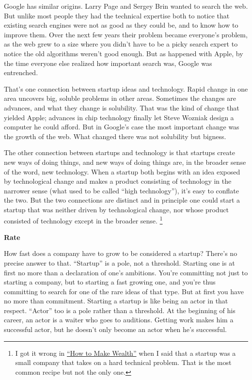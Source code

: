 \documentclass[12pt]{book}
\begin{document}
Google has similar origins. Larry Page and Sergey Brin wanted to search
the web. But unlike most people they had the technical expertise both to
notice that existing search engines were not as good as they could be,
and to know how to improve them. Over the next few years their problem
became everyone's problem, as the web grew to a size where you didn't
have to be a picky search expert to notice the old algorithms weren't
good enough. But as happened with Apple, by the time everyone else
realized how important search was, Google was entrenched.

That's one connection between startup ideas and technology. Rapid change
in one area uncovers big, soluble problems in other areas. Sometimes the
changes are advances, and what they change is solubility. That was the
kind of change that yielded Apple; advances in chip technology finally
let Steve Wozniak design a computer he could afford. But in Google's
case the most important change was the growth of the web. What changed
there was not solubility but bigness.

The other connection between startups and technology is that startups
create new ways of doing things, and new ways of doing things are, in
the broader sense of the word, new technology. When a startup both
begins with an idea exposed by technological change and makes a product
consisting of technology in the narrower sense (what used to be called
``high technology''), it's easy to conflate the two. But the two
connections are distinct and in principle one could start a startup that
was neither driven by technological change, nor whose product consisted
of technology except in the broader sense. \footnote{I got it wrong in \href{wealth.html}{``How to Make Wealth''}
when I said that a startup was a small company that takes on a hard
technical problem. That is the most common recipe but not the only one.}

\textbf{Rate}

How fast does a company have to grow to be considered a startup? There's
no precise answer to that. ``Startup'' is a pole, not a threshold.
Starting one is at first no more than a declaration of one's ambitions.
You're committing not just to starting a company, but to starting a fast
growing one, and you're thus committing to search for one of the rare
ideas of that type. But at first you have no more than commitment.
Starting a startup is like being an actor in that respect. ``Actor'' too
is a pole rather than a threshold. At the beginning of his career, an
actor is a waiter who goes to auditions. Getting work makes him a
successful actor, but he doesn't only become an actor when he's
successful.
\end{document}
